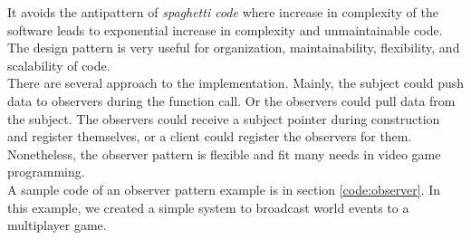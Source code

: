 \begin{multicols}{2}
It avoids the antipattern of \textit{spaghetti code} where increase in complexity of the software leads to exponential increase in complexity and unmaintainable code. The design pattern is very useful for organization, maintainability, flexibility, and scalability of code.\bs
\\
There are several approach to the implementation. Mainly, the subject could push data to observers during the function call. Or the observers could pull data from the subject. The observers could receive a subject pointer during construction and register themselves, or a client could register the observers for them. Nonetheless, the observer pattern is flexible and fit many needs in video game programming.\bs
\\
A sample code of an observer pattern example is in section \ref{code:observer}. In this example, we created a simple system to broadcast world events to a multiplayer game.



\iftwocolumns
\end{multicols}
\fi